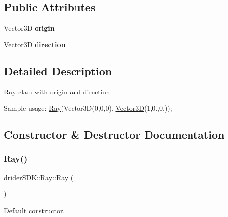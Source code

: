\subsection*{Public Attributes}
\begin{DoxyCompactItemize}
\item 
\mbox{\label{classdrider_s_d_k_1_1_ray_a19e9f70cb5ea9b4f3e7ba4e90b94da8a}} 
\hyperlink{classdrider_s_d_k_1_1_vector3_d}{Vector3D} {\bfseries origin}
\item 
\mbox{\label{classdrider_s_d_k_1_1_ray_ae4e57aeec93651bda9f40ec59270511e}} 
\hyperlink{classdrider_s_d_k_1_1_vector3_d}{Vector3D} {\bfseries direction}
\end{DoxyCompactItemize}


\subsection{Detailed Description}
\hyperlink{classdrider_s_d_k_1_1_ray}{Ray} class with origin and direction

Sample usage\+: \hyperlink{classdrider_s_d_k_1_1_ray}{Ray}(Vector3\+D(0,0,0), \hyperlink{classdrider_s_d_k_1_1_vector3_d}{Vector3D}(1,0.,0.)); 

\subsection{Constructor \& Destructor Documentation}
\mbox{\label{classdrider_s_d_k_1_1_ray_abff6862c02165733a7c6d68b669b795d}} 
\subsubsection{\texorpdfstring{Ray()}{Ray()}\hspace{0.1cm}{\footnotesize\ttfamily [1/2]}}
{\footnotesize\ttfamily drider\+S\+D\+K\+::\+Ray\+::\+Ray (\begin{DoxyParamCaption}{ }\end{DoxyParamCaption})\hspace{0.3cm}{\ttfamily [inline]}}

Default constructor. \mbox{\label{classdrider_s_d_k_1_1_ray_aa34f727ec759f76cb389e8162b26cb23}} 
